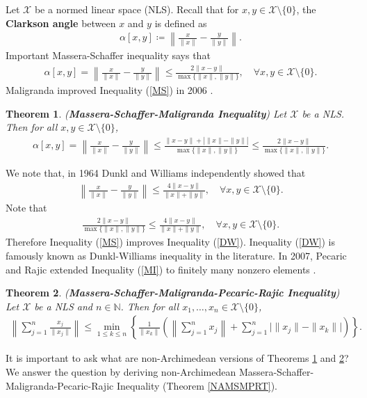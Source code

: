 \documentclass{amsart}
\newtheorem{theorem}{Theorem}[section]
\begin{document}
Let $\mathcal{X}$ be a normed linear space (NLS). Recall that for $x, y \in \mathcal{X}\setminus\{0\}$, the \textbf{Clarkson angle} \cite{CLARKSON} between $x$ and $y$ is defined as 
\begin{align*}
	\alpha[x,y]\coloneqq \left\|\frac{x}{\|x\|}-\frac{y}{\|y\|}\right\|.
\end{align*}
Important Massera-Schaffer inequality \cite{MASSERASCHAFFER} says that 
\begin{align}\label{MS}
	\alpha[x,y]=\left\|\frac{x}{\|x\|}-\frac{y}{\|y\|}\right\|\leq \frac{2\|x-y\|}{\max\{\|x\|, \|y\|\}}, \quad \forall x, y \in \mathcal{X}\setminus\{0\}.
\end{align}
Maligranda improved Inequality (\ref{MS}) in 2006 \cite{MALIGRANDA}. 
\begin{theorem} \cite{MALIGRANDA, MERCER} \label{DWMT} (\textbf{Massera-Schaffer-Maligranda Inequality})
Let $\mathcal{X}$ be a NLS. Then for all $x, y \in \mathcal{X}\setminus\{0\}$, 
\begin{align}\label{MI}
	\alpha[x,y]=\left\|\frac{x}{\|x\|}-\frac{y}{\|y\|}\right\|\leq \frac{\|x-y\|+|\|x\|-\|y\||}{\max\{\|x\|, \|y\|\}}\leq \frac{2\|x-y\|}{\max\{\|x\|, \|y\|\}}.	
\end{align}
\end{theorem}
We note that,  in 1964 Dunkl and Williams \cite{DUNKLWILLIAMS} independently showed that 
\begin{align}\label{DW}
\left\|\frac{x}{\|x\|}-\frac{y}{\|y\|}\right\|\leq \frac{4\|x-y\|}{\|x\|+\|y\|}, \quad \forall x, y \in \mathcal{X}\setminus\{0\}.	
\end{align}
Note that 
\begin{align*}
	\frac{2\|x-y\|}{\max\{\|x\|, \|y\|\}}\leq \frac{4\|x-y\|}{\|x\|+\|y\|}, \quad \forall x, y \in \mathcal{X}\setminus\{0\}.	
\end{align*}
Therefore Inequality (\ref{MS}) improves Inequality (\ref{DW}). 
Inequality (\ref{DW}) is famously known as Dunkl-Williams inequality in the literature. In 2007, Pecaric and Rajic extended Inequality (\ref{MI}) to finitely many nonzero elements \cite{PECARICRAJIC}. 
\begin{theorem} \cite{PECARICRAJIC} (\textbf{Massera-Schaffer-Maligranda-Pecaric-Rajic Inequality}) \label{DWMPRT}
Let $\mathcal{X}$ be a NLS and $n \in \mathbb{N}$. Then for all $x_1, \dots, x_n \in \mathcal{X}\setminus\{0\}$, 
\begin{align*}
\left\|\sum_{j=1}^{n}\frac{x_j}{\|x_j\|}\right\|\leq \min_{1\leq k \leq n}\left\{\frac{1}{\|x_k\|}\left(\left\|\sum_{j=1}^{n}x_j\right\|+\sum_{j=1}^{n}\big|\|x_j\|-\|x_k\|\big|\right)\right\}.
\end{align*}
\end{theorem}
It  is important to ask what are non-Archimedean versions of Theorems \ref{DWMT} and \ref{DWMPRT}? We answer the question by deriving non-Archimedean Massera-Schaffer-Maligranda-Pecaric-Rajic Inequality (Theorem \ref{NAMSMPRT}).
\end{document}
